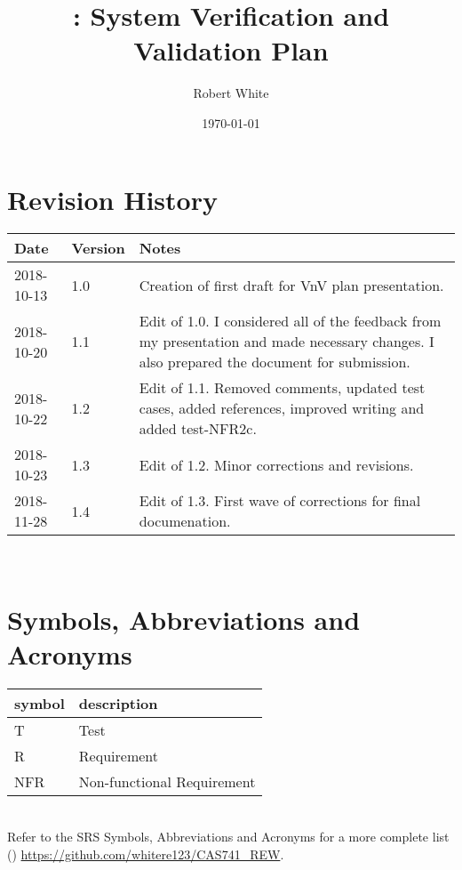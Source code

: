\documentclass[12pt, titlepage]{article}
\begin{document}
\title{\progname: System Verification and Validation Plan} 
\author{Robert White}
\date{\today}
	
\maketitle


\section{Revision History}

\begin{tabularx}{\textwidth}{p{3cm}p{2cm}X}
\toprule {\bf Date} & {\bf Version} & {\bf Notes}\\
\midrule
2018-10-13 & 1.0 & Creation of first draft for VnV plan presentation.\\
2018-10-20 & 1.1 & Edit of 1.0. I considered all of the feedback from my 
presentation and made necessary changes. I also prepared the document for 
submission. \\ 
2018-10-22 & 1.2 & Edit of 1.1. Removed comments, updated test cases, added 
references, improved writing and added test-NFR2c. \\ 
2018-10-23 & 1.3 & Edit of 1.2. Minor corrections and revisions. \\
2018-11-28 & 1.4 & Edit of 1.3. First wave of corrections for final 
documenation.\\
\bottomrule
\end{tabularx}

~\newpage

\section{Symbols, Abbreviations and Acronyms}

\renewcommand{\arraystretch}{1.2}
\begin{tabular}{l l} 
  \toprule		
  \textbf{symbol} & \textbf{description}\\
  \midrule 
  T & Test\\
  R & Requirement\\ 
  NFR & Non-functional Requirement\\
  \bottomrule
\end{tabular}\\

Refer to the SRS Symbols, Abbreviations and Acronyms for a more 
complete list (\cite{SRS}) \url{https://github.com/whitere123/CAS741_REW}. 
\end{document}
